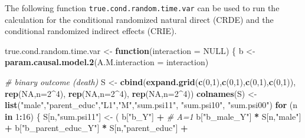 \documentclass[
]{book}
\newenvironment{Shaded}{\begin{snugshade}}{\end{snugshade}}
\newcommand{\AttributeTok}[1]{\textcolor[rgb]{0.13,0.29,0.53}{#1}}
\newcommand{\CommentTok}[1]{\textcolor[rgb]{0.56,0.35,0.01}{\textit{#1}}}
\newcommand{\ConstantTok}[1]{\textcolor[rgb]{0.56,0.35,0.01}{#1}}
\newcommand{\ControlFlowTok}[1]{\textcolor[rgb]{0.13,0.29,0.53}{\textbf{#1}}}
\newcommand{\DecValTok}[1]{\textcolor[rgb]{0.00,0.00,0.81}{#1}}
\newcommand{\FunctionTok}[1]{\textcolor[rgb]{0.13,0.29,0.53}{\textbf{#1}}}
\newcommand{\NormalTok}[1]{#1}
\newcommand{\OtherTok}[1]{\textcolor[rgb]{0.56,0.35,0.01}{#1}}
\newcommand{\SpecialCharTok}[1]{\textcolor[rgb]{0.81,0.36,0.00}{\textbf{#1}}}
\newcommand{\StringTok}[1]{\textcolor[rgb]{0.31,0.60,0.02}{#1}}
\begin{document}
The following function \texttt{true.cond.random.time.var} can be used to run the calculation for the conditional randomized natural direct (CRDE) and the conditional randomized indirect effects (CRIE).

\begin{Shaded}
\begin{Highlighting}[]
\NormalTok{true.cond.random.time.var }\OtherTok{\textless{}{-}} \ControlFlowTok{function}\NormalTok{(}\AttributeTok{interaction =} \ConstantTok{NULL}\NormalTok{) \{}
\NormalTok{  b }\OtherTok{\textless{}{-}} \FunctionTok{param.causal.model.2}\NormalTok{(}\AttributeTok{A.M.interaction =}\NormalTok{ interaction)}
  
  \CommentTok{\# binary outcome (death)}
\NormalTok{  S }\OtherTok{\textless{}{-}} \FunctionTok{cbind}\NormalTok{(}\FunctionTok{expand.grid}\NormalTok{(}\FunctionTok{c}\NormalTok{(}\DecValTok{0}\NormalTok{,}\DecValTok{1}\NormalTok{),}\FunctionTok{c}\NormalTok{(}\DecValTok{0}\NormalTok{,}\DecValTok{1}\NormalTok{),}\FunctionTok{c}\NormalTok{(}\DecValTok{0}\NormalTok{,}\DecValTok{1}\NormalTok{),}\FunctionTok{c}\NormalTok{(}\DecValTok{0}\NormalTok{,}\DecValTok{1}\NormalTok{)), }\FunctionTok{rep}\NormalTok{(}\ConstantTok{NA}\NormalTok{,}\AttributeTok{n=}\DecValTok{2}\SpecialCharTok{\^{}}\DecValTok{4}\NormalTok{), }
             \FunctionTok{rep}\NormalTok{(}\ConstantTok{NA}\NormalTok{,}\AttributeTok{n=}\DecValTok{2}\SpecialCharTok{\^{}}\DecValTok{4}\NormalTok{), }\FunctionTok{rep}\NormalTok{(}\ConstantTok{NA}\NormalTok{,}\AttributeTok{n=}\DecValTok{2}\SpecialCharTok{\^{}}\DecValTok{4}\NormalTok{))}
  \FunctionTok{colnames}\NormalTok{(S) }\OtherTok{\textless{}{-}} \FunctionTok{list}\NormalTok{(}\StringTok{"male"}\NormalTok{,}\StringTok{"parent\_educ"}\NormalTok{,}\StringTok{"L1"}\NormalTok{,}\StringTok{"M"}\NormalTok{,}\StringTok{"sum.psi11"}\NormalTok{, }\StringTok{"sum.psi10"}\NormalTok{, }
                      \StringTok{"sum.psi00"}\NormalTok{)}
  \ControlFlowTok{for}\NormalTok{ (n }\ControlFlowTok{in} \DecValTok{1}\SpecialCharTok{:}\DecValTok{16}\NormalTok{) \{}
\NormalTok{    S[n,}\StringTok{"sum.psi11"}\NormalTok{] }\OtherTok{\textless{}{-}}\NormalTok{  ( b[}\StringTok{"b\_Y"}\NormalTok{] }\SpecialCharTok{+}                                           \CommentTok{\# A=1}
\NormalTok{                             b[}\StringTok{"b\_male\_Y"}\NormalTok{] }\SpecialCharTok{*}\NormalTok{ S[n,}\StringTok{"male"}\NormalTok{] }\SpecialCharTok{+} 
\NormalTok{                             b[}\StringTok{"b\_parent\_educ\_Y"}\NormalTok{] }\SpecialCharTok{*}\NormalTok{ S[n,}\StringTok{"parent\_educ"}\NormalTok{] }\SpecialCharTok{+} 

\end{Highlighting}
\end{Shaded}
\end{document}
